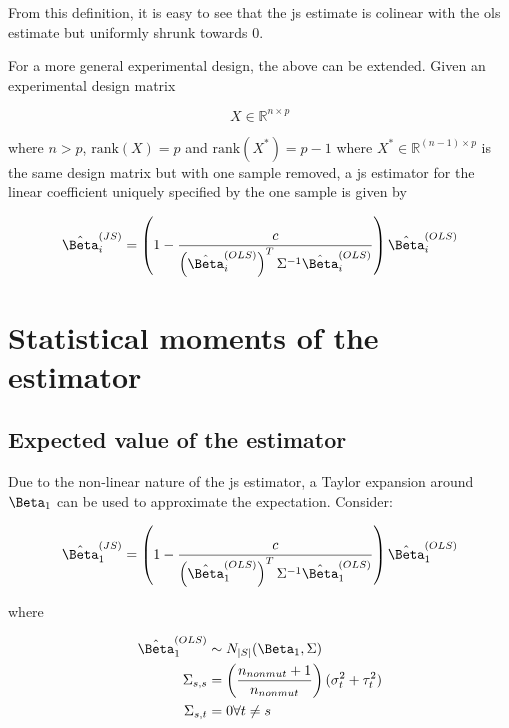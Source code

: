 From this definition, it is easy to see that the \gls{js} estimate is colinear with the \gls{ols} estimate but uniformly shrunk towards 0.

For a more general experimental design, the above can be extended.
Given an experimental design matrix

\begin{equation*}
  X \in \mathbb{R}^{n \times p}
\end{equation*}

where $n > p$, $\text{rank}(X) = p$ and $\text{rank}(X^*) = p - 1$ where $X^* \in \mathbb{R}^{(n - 1) \times p}$ is the same design matrix but with one sample removed, a \gls{js} estimator for the linear coefficient uniquely specified by the one sample is given by

\begin{equation*}
  \hat{\Beta}_i^{(JS)} = \left( 1 - \frac{c}{\left( \hat{\Beta}_i^{(OLS)} \right)^T \Sigma^{-1} \hat{\Beta}_i^{(OLS)}} \right) \hat{\Beta}_i^{(OLS)}
\end{equation*}

\section{Statistical moments of the  estimator}
\label{sec:JS_moments}

\subsection{Expected value of the  estimator}

Due to the non-linear nature of the \gls{js} estimator, a Taylor expansion around $\Beta_1$ can be used to approximate the expectation.
Consider:

\begin{equation*}
  \hat{\Beta}_1^{(JS)} = \left( 1 - \frac{c}{\left( \hat{\Beta}_1^{(OLS)} \right)^T \Sigma^{-1} \hat{\Beta}_1^{(OLS)}} \right) \hat{\Beta}_1^{(OLS)}
\end{equation*}

where

\begin{align*}
  \hat{\Beta}_1^{(OLS)} &\sim N_{|S|}(\Beta_1, \Sigma) \\
  \Sigma_{s,s} &= \left( \frac{n_{nonmut} + 1}{n_{nonmut}} \right) (\sigma_t^2 + \tau_t^2) \\
  \Sigma_{s,t} &= 0 \forall t \ne s
\end{align*}

